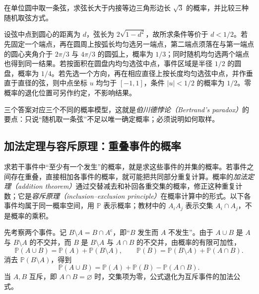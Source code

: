 \begin{example}
\label{ex:study-bertrand-chord}
在单位圆中取一条弦，求弦长大于内接等边三角形边长 $\sqrt3$ 的概率，并比较三种随机取弦方式。
\end{example}

\begin{solve}
设弦中点到圆心的距离为 $d$，弦长为 $2\sqrt{1-d^2}$，故所求条件等价于 $d<1/2$。若先固定一个端点，再在圆周上按弧长均匀选另一端点，第二端点须落在与第一端点的圆心夹角介于 $2\pi/3$ 与 $4\pi/3$ 的圆弧上，概率为 $1/3$；同时随机均匀选两个端点也得到同一结果。若按面积在圆盘内均匀选弦中点，事件区域是半径 $1/2$ 的圆盘，概率为 $1/4$。若先选一个方向，再在相应直径上按长度均匀选弦中点，并作垂直于直径的弦，则中点坐标 $u$ 均匀于 $[-1,1]$，条件 $|u|<1/2$ 的概率为 $1/2$。零概率的退化位置可另作约定，不影响结果。

三个答案对应三个不同的概率模型，这就是\emph{伯川德悖论（Bertrand's paradox）}的要点：只说“随机取一条弦”不足以唯一确定概率；必须说明如何取样。
\end{solve}

\subsection{加法定理与容斥原理：重叠事件的概率}
\label{subsec:study-inclusion-exclusion}

求若干事件中“至少有一个发生”的概率，就是求这些事件的并集的概率。若事件之间存在重叠，直接相加各事件的概率，就可能把共同部分重复计算。概率的\emph{加法定理（addition theorem）}通过交替减去和补回各重交集的概率，修正这种重复计数；它是\emph{容斥原理（inclusion--exclusion principle）}在概率计算中的形式。以下各事件均属于同一概率空间，用 $\mathbb P$ 表示概率；教材中的 $A_iA_j$ 表示交集 $A_i\cap A_j$，不是概率的乘积。

先考察两个事件。记 $B\setminus A=B\cap A^{\mathrm c}$，即“$B$ 发生而 $A$ 不发生”。由于 $A\cup B$ 是 $A$ 与 $B\setminus A$ 的不交并，而 $B$ 是 $B\setminus A$ 与 $A\cap B$ 的不交并，由概率的有限可加性，
\[
  \mathbb P(A\cup B)=\mathbb P(A)+\mathbb P(B\setminus A),
  \qquad
  \mathbb P(B)=\mathbb P(B\setminus A)+\mathbb P(A\cap B).
\]
消去 $\mathbb P(B\setminus A)$，得到
\begin{equation}
  \mathbb P(A\cup B)
    =\mathbb P(A)+\mathbb P(B)-\mathbb P(A\cap B).
  \label{eq:study-inclusion-exclusion-two}
\end{equation}
当 $A,B$ 互斥，即 $A\cap B=\varnothing$ 时，交集项为零，公式退化为互斥事件的加法公式。

